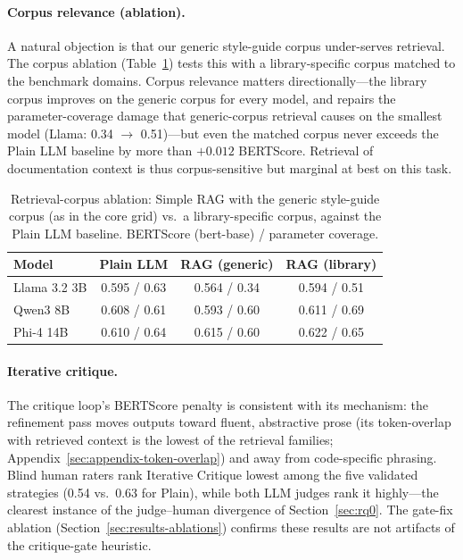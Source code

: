 \documentclass[pdflatex,sn-mathphys-ay]{sn-jnl}%
\theoremstyle{thmstyleone}%
\theoremstyle{thmstyletwo}%
\theoremstyle{thmstylethree}%
\begin{document}
{\paragraph{Corpus relevance (ablation).}
A natural objection is that our generic style-guide corpus under-serves retrieval. The corpus ablation (Table~\ref{tab:corpus-ablation}) tests this with a library-specific corpus matched to the benchmark domains. Corpus relevance matters directionally---the library corpus improves on the generic corpus for every model, and repairs the parameter-coverage damage that generic-corpus retrieval causes on the smallest model (Llama: 0.34 $\rightarrow$ 0.51)---but even the matched corpus never exceeds the Plain LLM baseline by more than $+0.012$ BERTScore. Retrieval of documentation context is thus corpus-sensitive but marginal at best on this task.

\begin{table}[h]
\centering
\small
\caption{Retrieval-corpus ablation: Simple RAG with the generic style-guide corpus (as in the core grid) vs.\ a library-specific corpus, against the Plain LLM baseline. BERTScore (bert-base) / parameter coverage.}
\label{tab:corpus-ablation}
\begin{tabular}{lccc}
\toprule
\textbf{Model} & \textbf{Plain LLM} & \textbf{RAG (generic)} & \textbf{RAG (library)} \\
\midrule
Llama 3.2 3B & 0.595 / 0.63 & 0.564 / 0.34 & 0.594 / 0.51 \\
Qwen3 8B     & 0.608 / 0.61 & 0.593 / 0.60 & 0.611 / 0.69 \\
Phi-4 14B    & 0.610 / 0.64 & 0.615 / 0.60 & 0.622 / 0.65 \\
\bottomrule
\end{tabular}
\end{table}

\paragraph{Iterative critique.}
The critique loop's BERTScore penalty is consistent with its mechanism: the refinement pass moves outputs toward fluent, abstractive prose (its token-overlap with retrieved context is the lowest of the retrieval families; Appendix~\ref{sec:appendix-token-overlap}) and away from code-specific phrasing. Blind human raters rank Iterative Critique lowest among the five validated strategies (0.54 vs.\ 0.63 for Plain), while both LLM judges rank it highly---the clearest instance of the judge--human divergence of Section~\ref{sec:rq0}. The gate-fix ablation (Section~\ref{sec:results-ablations}) confirms these results are not artifacts of the critique-gate heuristic.

}
\end{document}
